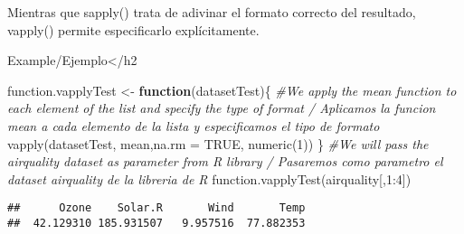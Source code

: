 \documentclass[
]{article}
\newenvironment{Shaded}{\begin{snugshade}}{\end{snugshade}}
\newcommand{\AttributeTok}[1]{\textcolor[rgb]{0.77,0.63,0.00}{#1}}
\newcommand{\CommentTok}[1]{\textcolor[rgb]{0.56,0.35,0.01}{\textit{#1}}}
\newcommand{\ConstantTok}[1]{\textcolor[rgb]{0.00,0.00,0.00}{#1}}
\newcommand{\ControlFlowTok}[1]{\textcolor[rgb]{0.13,0.29,0.53}{\textbf{#1}}}
\newcommand{\DecValTok}[1]{\textcolor[rgb]{0.00,0.00,0.81}{#1}}
\newcommand{\FunctionTok}[1]{\textcolor[rgb]{0.00,0.00,0.00}{#1}}
\newcommand{\NormalTok}[1]{#1}
\newcommand{\OtherTok}[1]{\textcolor[rgb]{0.56,0.35,0.01}{#1}}
\newcommand{\SpecialCharTok}[1]{\textcolor[rgb]{0.00,0.00,0.00}{#1}}
\begin{document}
Mientras que sapply() trata de adivinar el formato correcto del
resultado, vapply() permite especificarlo explícitamente.

Example/Ejemplo\textless/h2

\begin{Shaded}
\begin{Highlighting}[]
\NormalTok{function.vapplyTest }\OtherTok{\textless{}{-}} \ControlFlowTok{function}\NormalTok{(datasetTest)\{}
  \CommentTok{\#We apply the mean function to each element of the list and specify the type of format / Aplicamos la funcion mean a cada elemento de la lista y especificamos el tipo de formato}
  \FunctionTok{vapply}\NormalTok{(datasetTest, mean,}\AttributeTok{na.rm =} \ConstantTok{TRUE}\NormalTok{, }\FunctionTok{numeric}\NormalTok{(}\DecValTok{1}\NormalTok{))}
\NormalTok{\}}
\CommentTok{\#We will pass the airquality dataset as parameter from R library / Pasaremos como parametro el dataset airquality de la libreria de R}
\FunctionTok{function.vapplyTest}\NormalTok{(airquality[,}\DecValTok{1}\SpecialCharTok{:}\DecValTok{4}\NormalTok{])}
\end{Highlighting}
\end{Shaded}

\begin{verbatim}
##      Ozone    Solar.R       Wind       Temp 
##  42.129310 185.931507   9.957516  77.882353
\end{verbatim}
\end{document}
